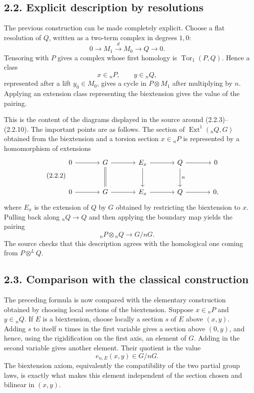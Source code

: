 \documentclass[11pt]{article}
\providecommand{\Tor}{\operatorname{Tor}}
\providecommand{\Ext}{\operatorname{Ext}}
\begin{document}
\subsection*{2.2. Explicit description by resolutions}

The previous construction can be made completely explicit.  Choose a flat resolution of \(Q\), written as a two-term complex in degrees \(1,0\):
\begin{equation}\tag{2.2.1}
        0\longrightarrow M_1\xrightarrow{d}M_0\longrightarrow Q\longrightarrow0.
\end{equation}
Tensoring with \(P\) gives a complex whose first homology is \(\Tor_1(P,Q)\).  Hence a class
\[
        x\in {}_nP,
        \qquad y\in {}_nQ,
\]
represented after a lift \(y_0\in M_0\), gives a cycle in \(P\otimes M_1\) after multiplying by \(n\).  Applying an extension class representing the biextension gives the value of the pairing.

This is the content of the diagrams displayed in the source around (2.2.3)--(2.2.10).  The important points are as follows.  The section of \(\Ext^1({}_nQ,G)\) obtained from the biextension and a torsion section \(x\in{}_nP\) is represented by a homomorphism of extensions
\begin{equation}\tag{2.2.2}
\begin{tikzcd}[column sep=large,row sep=large]
0\arrow[r]&G\arrow[r]\arrow[d,equal]&E_x\arrow[r]\arrow[d]&Q\arrow[r]\arrow[d,"n"]&0\\
0\arrow[r]&G\arrow[r]&E_x\arrow[r]&Q\arrow[r]&0,
\end{tikzcd}
\end{equation}
where \(E_x\) is the extension of \(Q\) by \(G\) obtained by restricting the biextension to \(x\).  Pulling back along \({}_nQ\to Q\) and then applying the boundary map yields the pairing
\[
        {}_nP\otimes {}_nQ\longrightarrow G/nG.
\]
The source checks that this description agrees with the homological one coming from \(P\otimes^LQ\).

\subsection*{2.3. Comparison with the classical construction}

The preceding formula is now compared with the elementary construction obtained by choosing local sections of the biextension.  Suppose \(x\in{}_nP\) and \(y\in{}_nQ\).  If \(E\) is a biextension, choose locally a section \(s\) of \(E\) above \((x,y)\).  Adding \(s\) to itself \(n\) times in the first variable gives a section above \((0,y)\), and hence, using the rigidification on the first axis, an element of \(G\).  Adding in the second variable gives another element.  Their quotient is the value
\begin{equation}\tag{2.3.1}
        e_{n,E}(x,y)\in G/nG.
\end{equation}
The biextension axiom, equivalently the compatibility of the two partial group laws, is exactly what makes this element independent of the section chosen and bilinear in \((x,y)\).
\end{document}
